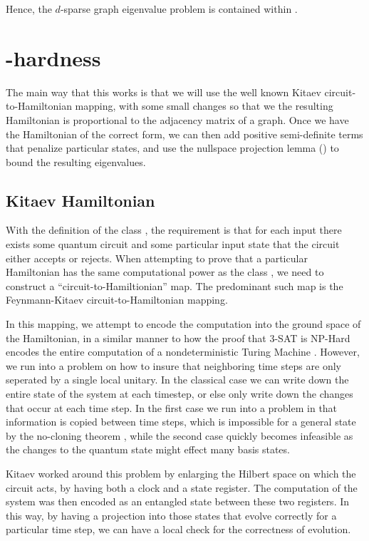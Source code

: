\documentclass[../thesis-main/thesis-main]{subfiles}
\begin{document}
Hence, the $d$-sparse graph eigenvalue problem is contained within \QMA.

\section{\QMA-hardness}

The main way that this works is that we will use the well known Kitaev circuit-to-Hamiltonian mapping, with some small changes so that we the resulting Hamiltonian is proportional to the adjacency matrix of a graph.  Once we have the Hamiltonian of the correct form, we can then add positive semi-definite terms that penalize particular states, and use the nullspace projection lemma () to bound the resulting eigenvalues.  

\subsection{Kitaev Hamiltonian}\label{sec:Kitaev_Hamiltonian}

With the definition of the class \QMA, the requirement is that for each input there exists some quantum circuit and some particular input state that the circuit either accepts or rejects.  When attempting to prove that a particular Hamiltonian has the same computational power as the class \QMA, we need to construct a ``circuit-to-Hamiltionian'' map.  The predominant such map is the Feynmann-Kitaev circuit-to-Hamiltonian mapping.

In this mapping, we attempt to encode the computation into the ground space of the Hamiltonian, in a similar manner to how the proof that 3-SAT is NP-Hard encodes the entire computation of a nondeterministic Turing Machine  \cite{SipserToC}.  However, we run into a problem on how to insure that neighboring time steps are only seperated by a single local unitary.  In the classical case we can write down the entire state of the system at each timestep, or else only write down the changes that occur at each time step.  In the first case we run into a problem in that information is copied between time steps, which is impossible for a general state by the no-cloning theorem \cite{KSV02}, while the second case quickly becomes infeasible as the changes to the quantum state might effect many basis states.

Kitaev worked around this problem by enlarging the Hilbert space on which the circuit acts, by having both a clock and a state register.  The computation of the system was then encoded as an entangled state between these two registers.  In this way, by having a projection into those states that evolve correctly for a particular time step, we can have a local check for the correctness of evolution.
\end{document}
